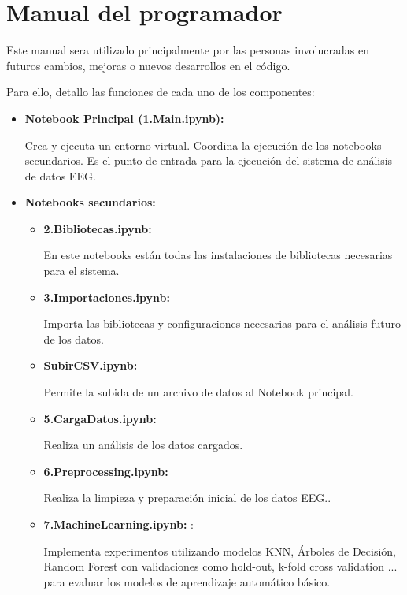   
  

\section{Manual del programador}

Este manual sera utilizado principalmente por las personas involucradas en futuros cambios, mejoras o nuevos desarrollos en el código.

Para ello, detallo las funciones de cada uno de los componentes:

  \begin{itemize}
  \tightlist
  \item
   \textbf{Notebook Principal (1.Main.ipynb):}
   
   Crea y ejecuta un entorno virtual. Coordina la ejecución de los notebooks secundarios. Es el punto de entrada para la ejecución del sistema de análisis de datos EEG.
  \item
   \textbf{Notebooks secundarios:}
   \begin{itemize}
   \tightlist
   \item
    \textbf{2.Bibliotecas.ipynb:} 
    
    En este notebooks están todas las instalaciones de bibliotecas necesarias para el sistema.
    
   \item
    \textbf{3.Importaciones.ipynb:} 
   
    Importa las bibliotecas y configuraciones necesarias para el análisis futuro de los datos.
    
   \item
    \textbf{SubirCSV.ipynb:} 
   
    Permite la subida de un archivo de datos al Notebook principal.
    
   \item
    \textbf{5.CargaDatos.ipynb:} 
   
    Realiza un análisis de los datos cargados.
    
   \item
    \textbf{6.Preprocessing.ipynb:} 
   
    Realiza la limpieza y preparación inicial de los datos EEG..
    
   \item
    \textbf{7.MachineLearning.ipynb:} : 
    
    Implementa experimentos utilizando modelos KNN, Árboles de Decisión, Random Forest con validaciones como hold-out, k-fold cross validation ... para evaluar los modelos de aprendizaje automático básico.
    

\end{itemize}
\end{itemize}

